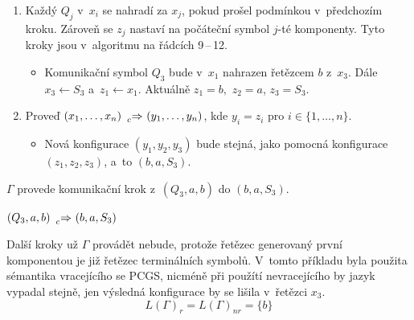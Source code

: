 \begin{example}
\begin{enumerate}
\begin{itemize}[label=$\circ$]
        \end{itemize}
        \item Každý $Q_j$ v~$x_i$ se nahradí za $x_j$, pokud prošel podmínkou v~předchozím kroku.
        Zároveň se $z_j$ nastaví na počáteční symbol $j$-té komponenty.
        Tyto kroky jsou v~algoritmu na řádcích 9\,--\,12.
        \begin{itemize}[label=$\circ$]
            \item Komunikační symbol $Q_3$ bude v~$x_1$ nahrazen řetězcem $b$ z~$x_3$. Dále $x_3 \gets S_3$ a~$z_1 \gets x_1$.
            Aktuálně $z_1 = b,$ $z_2 = a$, $z_3 = S_3$. 
        \end{itemize}
        \item Proveď $(x_1, \ldots, x_n) \ \prescript{}{c}{\Rightarrow} \ (y_1, \ldots, y_n)$, kde $y_i = z_i$ pro $i \in \{1, \ldots, n\}$.
        \begin{itemize}[label=$\circ$]
            \item Nová konfigurace $(y_1, y_2, y_3)$ bude stejná, jako pomocná konfigurace $(z_1, z_2, z_3)$, a~to $(b, a, S_3)$.
        \end{itemize}
    \end{enumerate}
    $\Gamma$ provede komunikační krok z~$(Q_3, a, b)$ do $(b, a, S_3)$.
    \begin{center}
        $(Q_3, a, b) \ \prescript{}{c}{\Rightarrow} \ (b, a, S_3)$
    \end{center}
    Další kroky už $\Gamma$ provádět nebude, protože řetězec generovaný první komponentou je již řetězec terminálních symbolů.
    V~tomto příkladu byla použita sémantika vracejícího se PCGS, nicméně při použítí nevracejícího by jazyk vypadal stejně, jen výsledná konfigurace by se lišila v~řetězci $x_3$.
    \begin{equation*}
        L(\Gamma)_r = L(\Gamma)_{nr} = \{b\}
    \end{equation*}
\end{example}

